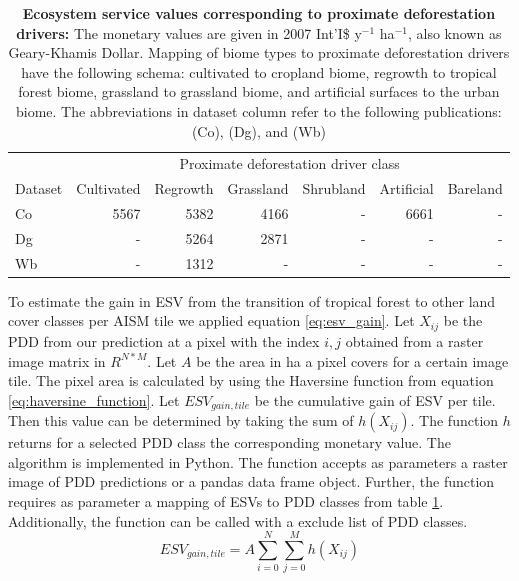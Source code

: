 		\begin{table}[ht]
			\centering
			\caption[Ecosystem service values corresponding to proximate deforestation drivers]{\textbf{Ecosystem service values corresponding to proximate deforestation drivers:} The monetary values are given in 2007 Int'I\$ y$^{-1}$ ha$^{-1}$, also known as Geary-Khamis Dollar. Mapping of biome types to proximate deforestation drivers have the following schema: cultivated to cropland biome, regrowth to tropical forest biome, grassland to grassland biome, and artificial surfaces to the urban biome. The abbreviations in dataset column refer to the following publications: \citet{Costanza2014} (Co), \citet{Groot2012} (Dg), and \citet{Siikamaki2015} (Wb)}
			\label{tab:esv_mapping}
			\begin{tabular}{lrrrrrr}
				\hline
				& \multicolumn{6}{c}{Proximate deforestation driver class} \\\cline{2-7}
				Dataset & Cultivated & Regrowth & Grassland & Shrubland &  Artificial & Bareland \\
				\hline
				Co & 5567 & 5382 & 4166 & - & 6661 & - \\
				Dg & - & 5264 & 2871 & - & - & - \\
				Wb & - & 1312 & - & - & - & - \\
				\hline
			\end{tabular}
		\end{table}

		To estimate the gain in \ac{ESV} from the transition of tropical forest to other land cover classes per \ac{AISM} tile we applied equation \ref{eq:esv_gain}. Let $X_{ij}$ be the \ac{PDD} from our prediction at a pixel with the index $i,j$ obtained from a raster image matrix in $R^{N*M}$. Let $A$ be the area in ha a pixel covers for a certain image tile. The pixel area is calculated by using the Haversine function from equation \ref{eq:haversine_function}. Let $ESV_{gain,tile}$ be the cumulative gain of \ac{ESV} per tile. Then this value can be determined by taking the sum of $h(X_{ij})$. The function $h$ returns for a selected \ac{PDD} class the corresponding monetary value. The algorithm is implemented in Python. The function accepts as parameters a raster image of \ac{PDD} predictions or a pandas data frame object. Further, the function requires as parameter a mapping of \acp{ESV} to \ac{PDD} classes from table \ref{tab:esv_mapping}. Additionally, the function can be called with a exclude list of \ac{PDD} classes.
		\begin{equation}
		\label{eq:esv_gain}
			ESV_{gain,tile} = A\displaystyle\sum_{i=0}^{N}\displaystyle\sum_{j=0}^{M} h(X_{ij})
		\end{equation}

